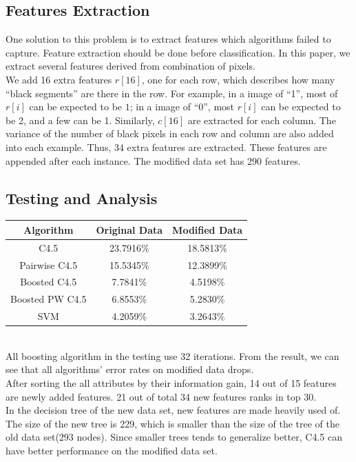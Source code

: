 \documentclass[a4paper,11pt]{article}
\begin{document}
\subsection{Features Extraction}
One solution to this problem is to extract features which algorithms failed to capture. Feature extraction should be done before classification. In this paper, we extract several features derived from combination of pixels.\\
We add 16 extra features $r[16]$, one for each row, which describes how many ``black segments'' are there in the row. For example, in a image of ``1'', most of $r[i]$ can be expected to be $1$; in a image of ``0'', most $r[i]$ can be expected to be 2, and a few can be 1. Similarly, $c[16]$ are extracted for each column. The variance of the number of black pixels in each row and column are also added into each example. Thus, 34 extra features are extracted. These features are appended after each instance. The modified data set has 290 features.\\
\subsection{Testing and Analysis}
\vspace{0.5cm}
\begin{tabular}{c c c}
Algorithm		&	Original Data	&Modified Data\\
\hline \hline
C4.5                            &23.7916\%		& 18.5813\%\\
Pairwise C4.5                   &15.5345\%      & 12.3899\%\\
Boosted C4.5	                &7.7841\%		& 4.5198\%\\
Boosted PW C4.5	                &6.8553\%       & 5.2830\%\\
SVM                         	&4.2059\%       & 3.2643\%\\
\end{tabular}
\vspace{0.5cm}\\
All boosting algorithm in the testing use 32 iterations. From the result, we can see that all algorithms' error rates on modified data drops.\\
After sorting the all attributes by their information gain, 14 out of 15 features are newly added features. 21 out of total 34 new features ranks in top 30.\\
In the decision tree of the new data set, new features are made heavily used of. The size of the new tree is 229, which is smaller than the size of the tree of the old data set(293 nodes). Since smaller trees tends to generalize better, C4.5 can have better performance on the modified data set.\\
\end{document}

